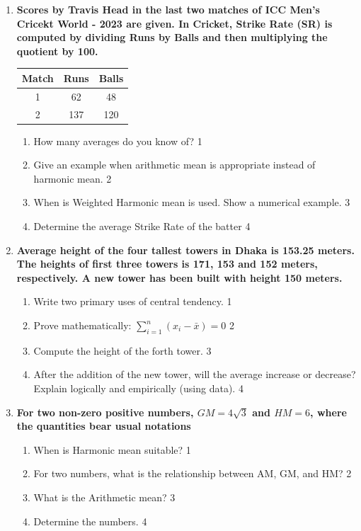 \documentclass[a4paper,oneside]{book}
\begin{document}
\begin{enumerate}
 \item
	  \textbf{Scores by Travis Head in the last two matches of ICC Men's Cricekt World - 2023 are given. In Cricket, Strike Rate (SR) is computed by dividing Runs by Balls and then multiplying the quotient by 100.} 
	  
	  \begin{table}[h]
	  \centering
\begin{tabular}{c|c|c}
Match & Runs & Balls \\ \hline 
1 & 62 & 48 \\
2 & 137 & 120 \\ \hline 
\end{tabular}
\end{table}
  
  \begin{enumerate}
    \item
	How many averages do you know of? \hfill 1
    \item
	Give an example when arithmetic mean is appropriate instead of harmonic mean. \hfill 2
    \item  
	When is Weighted Harmonic mean is used. Show a numerical example. \hfill 3
    \item
	Determine the average Strike Rate of the batter \hfill 4
  \end{enumerate}
  
   \item
	  \textbf{Average height of the four tallest towers in Dhaka is 153.25 meters. The heights of first three towers is 171, 153 and 152 meters, respectively. A new tower has been built with height 150 meters.} 
  
  \begin{enumerate}
    \item
	Write two primary uses of central tendency. \hfill 1
    \item
	Prove mathematically: $\displaystyle \sum_{i=1}^n (x_i-\bar x) = 0$ \hfill 2
    \item  
	Compute the height of the forth tower. \hfill 3
    \item
	After the addition of the new tower, will the average increase or decrease? Explain logically and empirically (using data). \hfill 4
  \end{enumerate}

 \item
	  \textbf{For two non-zero positive numbers, $GM=4\sqrt3$ and $HM=6$, where the quantities bear usual notations} 
  
  \begin{enumerate}
    \item
	When is Harmonic mean suitable? \hfill 1
    \item
	For two numbers, what is the relationship between AM, GM, and HM? \hfill 2
    \item  
	What is the Arithmetic mean? \hfill 3
    \item
	Determine the numbers. \hfill 4
  \end{enumerate}
  

\end{enumerate}
\end{document}

